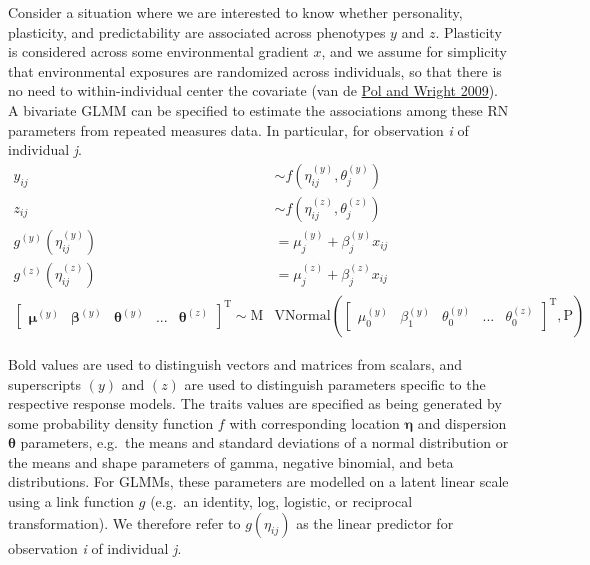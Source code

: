 \documentclass{article}
\begin{document}
Consider a situation where we are interested to know whether
personality, plasticity, and predictability are associated across
phenotypes \(y\) and \(z\). Plasticity is considered across some
environmental gradient \(x\), and we assume for simplicity that
environmental exposures are randomized across individuals, so that there
is no need to within-individual center the covariate (van de
\protect\hyperlink{ref-Pol2009}{Pol and Wright 2009}). A bivariate GLMM
can be specified to estimate the associations among these RN parameters
from repeated measures data. In particular, for observation \emph{i} of
individual \emph{j}. \begin{align} \tag{1.1}\label{eq:1.1}
y_{ij} & \sim f \left(\eta^{(y)}_{ij }, \theta^{(y)}_{j} \right) \\
z_{ij} & \sim f \left( \eta^{(z)}_{ij}, \theta^{(z)}_{j} \right) \nonumber \\
g^{(y)} \left( \eta^{(y)}_{ij} \right) &= \mu_j^{(y)}+\beta_j^{(y)}x_{ij} \nonumber \\
g^{(z)} \left( \eta^{(z)}_{ij} \right) &= \mu_j^{(z)}+\beta_j^{(z)}x_{ij} \nonumber \\
\begin{bmatrix}
\boldsymbol{\mu}^{(y)} &
\boldsymbol{\beta}^{(y)} &
\boldsymbol{\theta}^{(y)} & 
...  &
\boldsymbol{\theta}^{(z)}
\end{bmatrix} ^\textrm{T}
 \sim \mathrm{M}&\mathrm{VNormal} \left(
\begin{bmatrix}
{\mu^{(y)}_0} &
{\beta^{(y)}_1} &
{\theta^{(y)}_0} &
... &
{\theta^{(z)}_0}
\end{bmatrix}^\textrm{T},\boldsymbol{\mathrm{P}} \right) \nonumber
\end{align}

Bold values are used to distinguish vectors and matrices from scalars,
and superscripts \((y)\) and \((z)\) are used to distinguish parameters
specific to the respective response models. The traits values are
specified as being generated by some probability density function \(f\)
with corresponding location \(\boldsymbol{\eta}\) and dispersion
\(\boldsymbol{\theta}\) parameters, e.g.~the means and standard
deviations of a normal distribution or the means and shape parameters of
gamma, negative binomial, and beta distributions. For GLMMs, these
parameters are modelled on a latent linear scale using a link function
\(g\) (e.g.~an identity, log, logistic, or reciprocal transformation).
We therefore refer to \(g(\eta_{ij})\) as the linear predictor for
observation \emph{i} of individual \emph{j}.
\end{document}
